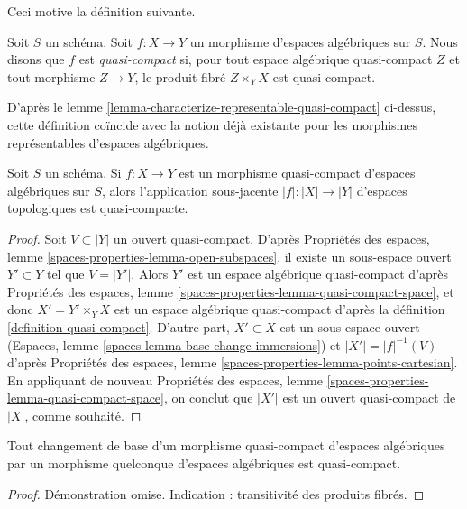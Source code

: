 \noindent
Ceci motive la définition suivante.

\begin{definition}
\label{definition-quasi-compact}
Soit $S$ un schéma.
Soit $f : X \to Y$ un morphisme d'espaces algébriques sur $S$.
Nous disons que $f$ est {\it quasi-compact} si, pour tout espace
algébrique quasi-compact $Z$ et tout morphisme $Z \to Y$, le produit fibré
$Z \times_Y X$ est quasi-compact.
\end{definition}

\noindent
D'après le lemme \ref{lemma-characterize-representable-quasi-compact}
ci-dessus, cette définition coïncide avec la notion déjà existante
pour les morphismes représentables d'espaces algébriques.

\begin{lemma}
\label{lemma-quasi-compact-is-quasi-compact}
Soit $S$ un schéma. Si $f : X \to Y$ est un morphisme quasi-compact
d'espaces algébriques sur $S$, alors l'application sous-jacente
$|f| : |X| \to |Y|$ d'espaces topologiques est quasi-compacte.
\end{lemma}

\begin{proof}
Soit $V \subset |Y|$ un ouvert quasi-compact. D'après Propriétés des espaces,
lemme \ref{spaces-properties-lemma-open-subspaces},
il existe un sous-espace ouvert $Y' \subset Y$ tel que $V = |Y'|$.
Alors $Y'$ est un espace algébrique quasi-compact d'après
Propriétés des espaces, lemme \ref{spaces-properties-lemma-quasi-compact-space},
et donc $X' = Y' \times_Y X$ est un espace algébrique
quasi-compact d'après la définition \ref{definition-quasi-compact}.
D'autre part, $X' \subset X$ est un sous-espace ouvert
(Espaces, lemme \ref{spaces-lemma-base-change-immersions})
et $|X'| = |f|^{-1}(V)$ d'après
Propriétés des espaces, lemme \ref{spaces-properties-lemma-points-cartesian}.
En appliquant de nouveau
Propriétés des espaces, lemme \ref{spaces-properties-lemma-quasi-compact-space},
on conclut que $|X'|$ est un ouvert quasi-compact de $|X|$, comme souhaité.
\end{proof}

\begin{lemma}
\label{lemma-base-change-quasi-compact}
Tout changement de base d'un morphisme quasi-compact d'espaces algébriques
par un morphisme quelconque d'espaces algébriques est quasi-compact.
\end{lemma}

\begin{proof}
Démonstration omise. Indication : transitivité des produits fibrés.
\end{proof}

